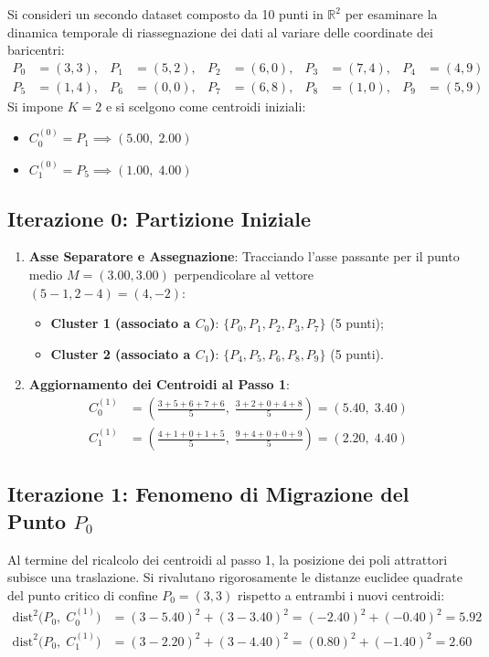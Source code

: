 Si consideri un secondo dataset composto da 10 punti in $\mathbb{R}^2$ per esaminare la dinamica temporale di riassegnazione dei dati al variare delle coordinate dei baricentri:
\begin{align}
P_0 &= (3, 3), & P_1 &= (5, 2), & P_2 &= (6, 0), & P_3 &= (7, 4), & P_4 &= (4, 9) \nonumber \\
P_5 &= (1, 4), & P_6 &= (0, 0), & P_7 &= (6, 8), & P_8 &= (1, 0), & P_9 &= (5, 9)
\end{align}
Si impone $K = 2$ e si scelgono come centroidi iniziali:
\begin{itemize}
    \item $C_0^{(0)} = P_1 \implies (5.00, \; 2.00)$
    \item $C_1^{(0)} = P_5 \implies (1.00, \; 4.00)$
\end{itemize}

\FloatBarrier
\subsection{Iterazione 0: Partizione Iniziale}
\begin{enumerate}[label=\textbf{\arabic*.}]
    \item \textbf{Asse Separatore e Assegnazione}:
    Tracciando l'asse passante per il punto medio $M = (3.00, 3.00)$ perpendicolare al vettore $(5 - 1, 2 - 4) = (4, -2)$:
    \begin{itemize}
        \item \textbf{Cluster 1 (associato a $C_0$)}: $\{P_0, P_1, P_2, P_3, P_7\}$ (5 punti);
        \item \textbf{Cluster 2 (associato a $C_1$)}: $\{P_4, P_5, P_6, P_8, P_9\}$ (5 punti).
    \end{itemize}
    \item \textbf{Aggiornamento dei Centroidi al Passo 1}:
    \begin{align}
    C_0^{(1)} &= \left( \frac{3 + 5 + 6 + 7 + 6}{5}, \; \frac{3 + 2 + 0 + 4 + 8}{5} \right) = (5.40, \; 3.40) \\[4pt]
    C_1^{(1)} &= \left( \frac{4 + 1 + 0 + 1 + 5}{5}, \; \frac{9 + 4 + 0 + 0 + 9}{5} \right) = (2.20, \; 4.40)
    \end{align}
\end{enumerate}

\FloatBarrier
\subsection{Iterazione 1: Fenomeno di Migrazione del Punto $P_0$}
Al termine del ricalcolo dei centroidi al passo 1, la posizione dei poli attrattori subisce una traslazione. Si rivalutano rigorosamente le distanze euclidee quadrate del punto critico di confine $P_0 = (3, 3)$ rispetto a entrambi i nuovi centroidi:
\begin{align}
\mathrm{dist}^2\big(P_0, \; C_0^{(1)}\big) &= (3 - 5.40)^2 + (3 - 3.40)^2 = (-2.40)^2 + (-0.40)^2 = \mathbf{5.92} \\[4pt]
\mathrm{dist}^2\big(P_0, \; C_1^{(1)}\big) &= (3 - 2.20)^2 + (3 - 4.40)^2 = (0.80)^2 + (-1.40)^2 = \mathbf{2.60}
\end{align}

